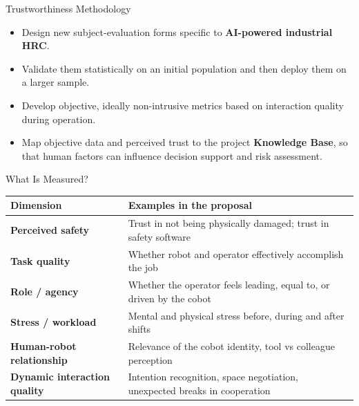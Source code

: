 \documentclass[aspectratio=169,10pt]{beamer}
\begin{document}
\begin{frame}{Trustworthiness Methodology}

\small
\begin{itemize}
  \item Design new subject-evaluation forms specific to \textbf{AI-powered industrial HRC}.
  \item Validate them statistically on an initial population and then deploy them on a larger sample.
  \item Develop objective, ideally non-intrusive metrics based on interaction quality during operation.
  \item Map objective data and perceived trust to the project \textbf{Knowledge Base}, so that human factors can influence decision support and risk assessment.
\end{itemize}

\end{frame}


\begin{frame}{What Is Measured?}

\small
\begin{tabularx}{\textwidth}{>{\bfseries}p{} X}
\toprule
Dimension & Examples in the proposal \\
\midrule
Perceived safety & Trust in not being physically damaged; trust in safety software \\
Task quality & Whether robot and operator effectively accomplish the job \\
Role / agency & Whether the operator feels leading, equal to, or driven by the cobot \\
Stress / workload & Mental and physical stress before, during and after shifts \\
Human-robot relationship & Relevance of the cobot identity, tool vs colleague perception \\
Dynamic interaction quality & Intention recognition, space negotiation, unexpected breaks in cooperation \\
\bottomrule
\end{tabularx}

\end{frame}
\end{document}
